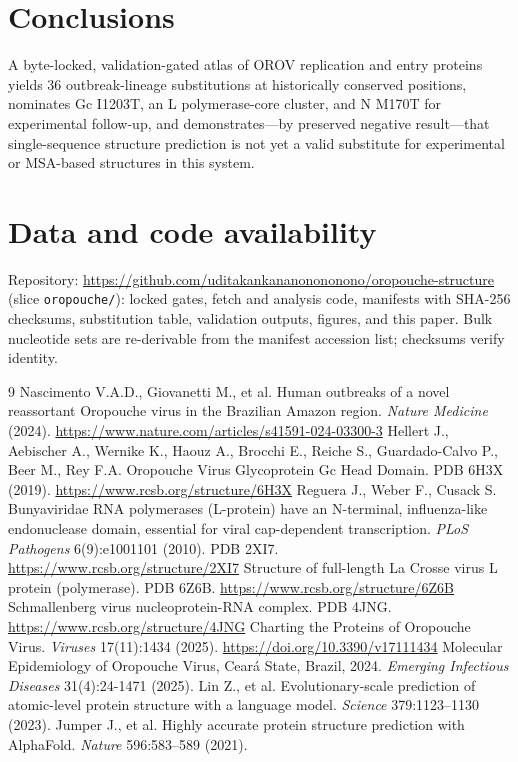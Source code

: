 \documentclass[12pt]{article}
\begin{document}
\section{Conclusions}
A byte-locked, validation-gated atlas of OROV replication and entry proteins yields 36 outbreak-lineage substitutions at historically conserved positions, nominates Gc I1203T, an L polymerase-core cluster, and N M170T for experimental follow-up, and demonstrates---by preserved negative result---that single-sequence structure prediction is not yet a valid substitute for experimental or MSA-based structures in this system.

\section*{Data and code availability}
Repository: \url{https://github.com/uditakankananonononono/oropouche-structure} (slice \texttt{oropouche/}): locked gates, fetch and analysis code, manifests with SHA-256 checksums, substitution table, validation outputs, figures, and this paper. Bulk nucleotide sets are re-derivable from the manifest accession list; checksums verify identity.

\begin{thebibliography}{9}
\small
{} Nascimento V.A.D., Giovanetti M., et al. Human outbreaks of a novel reassortant Oropouche virus in the Brazilian Amazon region. \textit{Nature Medicine} (2024). \url{https://www.nature.com/articles/s41591-024-03300-3}
 Hellert J., Aebischer A., Wernike K., Haouz A., Brocchi E., Reiche S., Guardado-Calvo P., Beer M., Rey F.A. Oropouche Virus Glycoprotein Gc Head Domain. PDB 6H3X (2019). \url{https://www.rcsb.org/structure/6H3X}
 Reguera J., Weber F., Cusack S. Bunyaviridae RNA polymerases (L-protein) have an N-terminal, influenza-like endonuclease domain, essential for viral cap-dependent transcription. \textit{PLoS Pathogens} 6(9):e1001101 (2010). PDB 2XI7. \url{https://www.rcsb.org/structure/2XI7}
 Structure of full-length La Crosse virus L protein (polymerase). PDB 6Z6B. \url{https://www.rcsb.org/structure/6Z6B}
 Schmallenberg virus nucleoprotein-RNA complex. PDB 4JNG. \url{https://www.rcsb.org/structure/4JNG}
 Charting the Proteins of Oropouche Virus. \textit{Viruses} 17(11):1434 (2025). \url{https://doi.org/10.3390/v17111434}
 Molecular Epidemiology of Oropouche Virus, Cear\'a State, Brazil, 2024. \textit{Emerging Infectious Diseases} 31(4):24-1471 (2025).
 Lin Z., et al. Evolutionary-scale prediction of atomic-level protein structure with a language model. \textit{Science} 379:1123--1130 (2023).
 Jumper J., et al. Highly accurate protein structure prediction with AlphaFold. \textit{Nature} 596:583--589 (2021).
\end{thebibliography}
\end{document}

